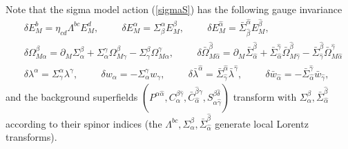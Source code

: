 \documentclass[12pt]{article}
\def\be{\begin{equation}}
\def\ee{\end{equation}}
\numberwithin{equation}{section}
\begin{document}
Note that the sigma model action (\ref{sigmaS}) has the following gauge invariance
\be
\begin{aligned}
	&\delta E^b_M = \eta_{cd} \Lambda^{bc} E^d_M, \hspace{1cm} \delta E^\alpha_M = \Sigma^\alpha_\beta E^\beta_M, \hspace{1cm}\delta E^{\hat{\alpha}}_M = \bar{\Sigma}^{\hat{\alpha}}_{\hat{\beta}} E^{\hat{\beta}}_M, \\
	&\delta\Omega_{M\alpha}^\beta = \partial_M \Sigma^\beta_\alpha + \Sigma^\gamma_\alpha \Omega_{M\gamma}^\beta - \Sigma_\gamma^\beta \Omega_{M\alpha}^\gamma, \hspace{1cm} \delta\bar{\Omega}_{M\hat{\alpha}}^{\hat{\beta}} = \partial_M \bar{\Sigma}^{\hat{\beta}}_{\hat{\alpha}} + \bar{\Sigma}^{\hat{\gamma}}_{\hat{\alpha}} \bar{\Omega}_{M\hat{\gamma}}^{\hat{\beta}} - \bar{\Sigma}_{\hat{\gamma}}^{\hat{\beta}} \bar{\Omega}_{M\hat{\alpha}}^{\hat{\gamma}} \\
	& \delta \lambda^\alpha = \Sigma^\alpha_\gamma \lambda^\gamma, \hspace{1cm} \delta w_\alpha = - \Sigma^\gamma_\alpha w_\gamma, \hspace{1cm}\delta \bar{\lambda}^{\hat{\alpha}} = \bar{\Sigma}^{\hat{\alpha}}_{\hat{\gamma}}\bar{\lambda}^{\hat{\gamma}}, \hspace{1cm}\delta \bar{w}_{\hat{\alpha}} = - \bar{\Sigma}^{\hat{\gamma}}_{\hat{\alpha}} \bar{w}_{\hat{\gamma}},
\end{aligned}
\ee
and the background superfields $(P^{\alpha \hat{\alpha}}, C_\alpha^{\beta \hat{\gamma}}, \bar{C}_{\hat{\alpha}}^{\hat{\beta}\gamma}, S_{\alpha \hat{\gamma}}^{\beta \hat{\delta}})$ transform with $\Sigma^\beta_\alpha, \bar{\Sigma}^{\hat{\beta}}_{\hat{\alpha}}$ according to their spinor indices (the $\Lambda^{bc}, \Sigma^\beta_\alpha, \bar{\Sigma}^{\hat{\beta}}_{\hat{\alpha}}$ generate local Lorentz transforms).
\end{document}
